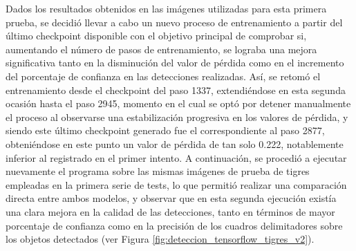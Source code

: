 Dados los resultados obtenidos en las imágenes utilizadas para esta primera prueba, se decidió llevar a cabo un nuevo proceso de entrenamiento a partir del último checkpoint disponible con el objetivo principal de comprobar si, aumentando el número de pasos de entrenamiento, se lograba una mejora significativa tanto en la disminución del valor de pérdida como en el incremento del porcentaje de confianza en las detecciones realizadas. Así, se retomó el entrenamiento desde el checkpoint del paso 1337, extendiéndose en esta segunda ocasión hasta el paso 2945, momento en el cual se optó por detener manualmente el proceso al observarse una estabilización progresiva en los valores de pérdida, y siendo este último checkpoint generado fue el correspondiente al paso 2877, obteniéndose en este punto un valor de pérdida de tan solo 0.222, notablemente inferior al registrado en el primer intento. A continuación, se procedió a ejecutar nuevamente el programa sobre las mismas imágenes de prueba de tigres empleadas en la primera serie de tests, lo que permitió realizar una comparación directa entre ambos modelos, y observar que en esta segunda ejecución existía una clara mejora en la calidad de las detecciones, tanto en términos de mayor porcentaje de confianza como en la precisión de los cuadros delimitadores sobre los objetos detectados (ver Figura \ref{fig:deteccion_tensorflow_tigres_v2}).

